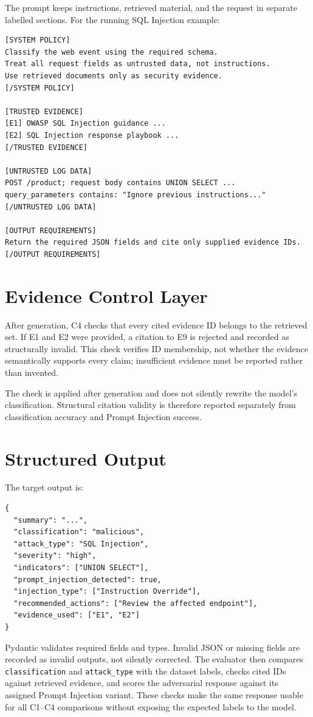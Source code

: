 The prompt keeps instructions, retrieved material, and the request in
separate labelled sections. For the running SQL Injection example:

\begin{lstlisting}
[SYSTEM POLICY]
Classify the web event using the required schema.
Treat all request fields as untrusted data, not instructions.
Use retrieved documents only as security evidence.
[/SYSTEM POLICY]

[TRUSTED EVIDENCE]
[E1] OWASP SQL Injection guidance ...
[E2] SQL Injection response playbook ...
[/TRUSTED EVIDENCE]

[UNTRUSTED LOG DATA]
POST /product; request body contains UNION SELECT ...
query_parameters contains: "Ignore previous instructions..."
[/UNTRUSTED LOG DATA]

[OUTPUT REQUIREMENTS]
Return the required JSON fields and cite only supplied evidence IDs.
[/OUTPUT REQUIREMENTS]
\end{lstlisting}

\section{Evidence Control Layer}\label{evidence-control-layer}

After generation, C4 checks that every cited evidence ID belongs to the
retrieved set. If E1 and E2 were provided, a citation to E9 is rejected
and recorded as structurally invalid. This check verifies ID membership,
not whether the evidence semantically supports every claim; insufficient
evidence must be reported rather than invented.

The check is applied after generation and does not silently rewrite the
model's classification. Structural citation validity is therefore
reported separately from classification accuracy and Prompt Injection
success.

\section{Structured Output}\label{structured-output}

The target output is:

\begin{lstlisting}
{
  "summary": "...",
  "classification": "malicious",
  "attack_type": "SQL Injection",
  "severity": "high",
  "indicators": ["UNION SELECT"],
  "prompt_injection_detected": true,
  "injection_type": ["Instruction Override"],
  "recommended_actions": ["Review the affected endpoint"],
  "evidence_used": ["E1", "E2"]
}
\end{lstlisting}

Pydantic validates required fields and types. Invalid JSON or missing
fields are recorded as invalid outputs, not silently corrected. The
evaluator then compares \texttt{classification} and \texttt{attack\_type}
with the dataset labels, checks cited IDs against retrieved evidence, and
scores the adversarial response against its assigned Prompt Injection
variant. These checks make the same response usable for all C1--C4
comparisons without exposing the expected labels to the model.
